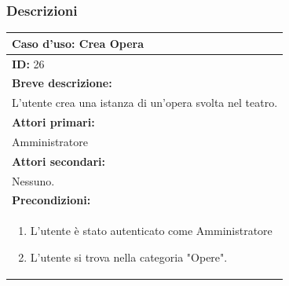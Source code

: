 \documentclass{article}
\begin{document}
            \subsubsection{Descrizioni}
                \begin{table}[H]
                    \centering
                    \begin{tabular}{|p{\linewidth}|}
                        \hline
                        \cellcolor{gray!100}
                        \color{white}
                        \centerline{\textbf{Caso d'uso:} Crea Opera} \\
                        \hline
                        \textbf{ID:} 26 \\
                        \hline
                        \cellcolor{gray!20}
                        \textbf{Breve descrizione:} \\
                        \cellcolor{gray!20}
                        L'utente crea una istanza di un'opera svolta nel teatro. \\
                        \hline
                        \textbf{Attori primari:} \\
                        \begin{minipage}{\linewidth}
                            Amministratore
                        \end{minipage}
                        \vspace{-10pt} \\
                        \hline
                        \textbf{Attori secondari:} \\
                        Nessuno. \\
                        \hline
                        \cellcolor{gray!20}
                        \textbf{Precondizioni:} \\
                        \cellcolor{gray!20}
                        \begin{minipage}{\linewidth}
                            \begin{enumerate}
                                \item L'utente è stato autenticato come Amministratore
                                \item L'utente si trova nella categoria "Opere".
                            \end{enumerate}
                        \end{minipage}
                        \vspace{-5pt} \\

\end{tabular}
\end{table}
\end{document}
